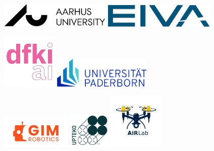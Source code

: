 \begin{center}

\includegraphics[width=0.4\textwidth, valign=c]{figs/logos/AUblack.pdf}
\hspace{5ex}
\includegraphics[width=0.4\textwidth, valign=c]{figs/logos/eivalogo.png}

\vspace{5ex}

\includegraphics[width=0.2\textwidth, valign=c]{Phd_thesis/figs/logos/dfki.png}
\hspace{14ex}
\includegraphics[width=0.35\textwidth, valign=c]{Phd_thesis/figs/logos/pad.png}


\vspace{2ex}

\includegraphics[width=0.25\textwidth, valign=c]{figs/logos/gim.jpg}
\hfill
\includegraphics[width=0.15\textwidth, valign=c]{Phd_thesis/figs/logos/upteko.png}
\hfill
\includegraphics[width=0.20\textwidth, valign=c]{Phd_thesis/figs/logos/airlab.jpg}



\end{center}

